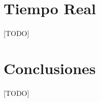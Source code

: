 \documentclass{subfiles}
\begin{document}
    \section{Tiempo Real}
    \label{sec:formulation_real_time}

      \paragraph{}
      [TODO]

    \section{Conclusiones}
    \label{sec:formulation_conclusions}

      \paragraph{}
      [TODO]
\end{document}
